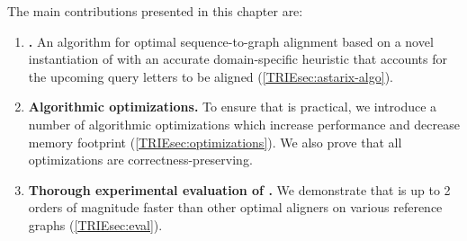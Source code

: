 
\begin{samepage}
The main contributions presented in this chapter are:
	
\begin{enumerate}
	\item \textbf{\astarix.} An algorithm for optimal sequence-to-graph
	alignment based on a novel instantiation of \A with an accurate
	domain-specific heuristic that accounts for the upcoming query letters to be
	aligned (\cref{TRIEsec:astarix-algo}).
	\item \textbf{Algorithmic optimizations.}
	To ensure that \astarix is practical, we introduce a number of algorithmic
	optimizations which increase performance and decrease memory footprint
	(\cref{TRIEsec:optimizations}). We also prove that all optimizations are
	correctness-preserving.
	\item \textbf{Thorough experimental evaluation of \astarix.}
	We demonstrate that \astarix is up to 2 orders of magnitude faster than
	other optimal aligners on various reference graphs (\cref{TRIEsec:eval}).
\end{enumerate}
\end{samepage}
